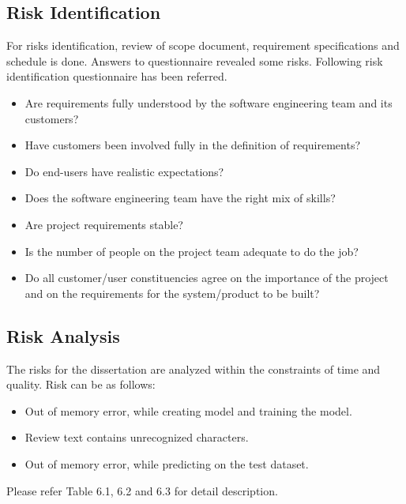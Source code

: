 \documentclass[oneside,a4paper,12pt]{pictreport}
\begin{document}
\subsection{Risk Identification}
For risks identification, review of scope document, requirement specifications and schedule is done. Answers to questionnaire revealed some risks. Following risk identification questionnaire has been referred.
\begin{itemize}
\item Are requirements fully understood by the software engineering team and its customers?
\item Have customers been involved fully in the definition of requirements?
\item Do end-users have realistic expectations?
\item Does the software engineering team have the right mix of skills?
\item Are project requirements stable?
\item Is the number of people on the project team adequate to do the job?
\item Do all customer/user constituencies agree on the importance of the project and on the requirements for the system/product to be built?
\end{itemize}

\subsection{Risk Analysis}
The risks for the dissertation are analyzed within the constraints of time and quality. Risk can be as follows:

\begin{itemize}
\item Out of memory error, while creating model and training the model.
\item Review text contains unrecognized characters.
\item Out of memory error, while predicting on the test dataset.
\end{itemize}
Please refer Table 6.1, 6.2 and 6.3 for detail description.
\end{document}
